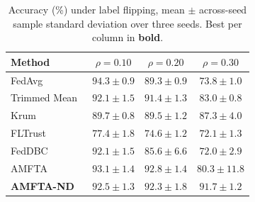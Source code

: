 \begin{table}[H]
	\caption{Accuracy (\%) under label flipping, mean $\pm$ across-seed sample standard deviation over three seeds. Best per column in \textbf{bold}.}
	\label{tab:labelflip}
	\centering
	\begin{tabular}{@{}lccc@{}}
		\toprule
		\textbf{Method} & $\rho=0.10$ & $\rho=0.20$ & $\rho=0.30$\\
		\midrule
		FedAvg~\cite{mcmahan2017communication} & $\mathbf{94.3}\pm0.9$ & $89.3\pm0.9$ & $73.8\pm1.0$\\
		Trimmed Mean~\cite{yin2018byzantine} & $92.1\pm1.5$ & $91.4\pm1.3$ & $83.0\pm0.8$\\
		Krum~\cite{blanchard2017byzantine} & $89.7\pm0.8$ & $89.5\pm1.2$ & $87.3\pm4.0$\\
		FLTrust~\cite{cao2021fltrust} & $77.4\pm1.8$ & $74.6\pm1.2$ & $72.1\pm1.3$\\
		FedDBC~\cite{feddbc2026} & $92.1\pm1.5$ & $85.6\pm6.6$ & $72.0\pm2.9$\\
		AMFTA & $93.1\pm1.4$ & $\mathbf{92.8}\pm1.4$ & $80.3\pm11.8$\\
		\textbf{AMFTA-ND} & $92.5\pm1.3$ & $92.3\pm1.8$ & $\mathbf{91.7}\pm1.2$\\
		\bottomrule
	\end{tabular}
\end{table}
